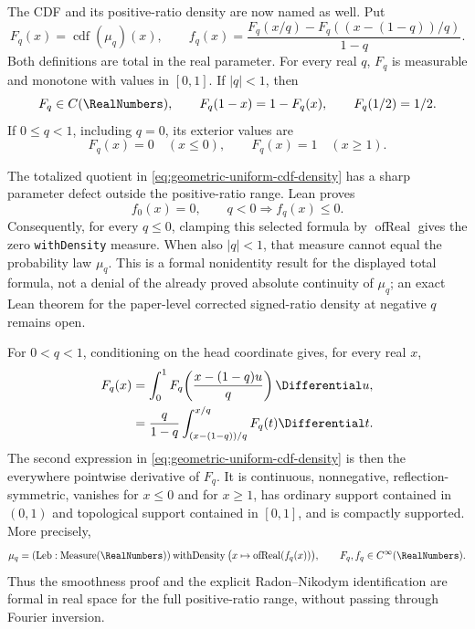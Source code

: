 \documentclass[11pt,oneside]{article}
\theoremstyle{definition}
\theoremstyle{remark}
\begin{document}
The CDF and its positive-ratio density are now named as well.  Put
\begin{equation}
 F_q(x)=\operatorname{cdf}(\mu_q)(x),
 \qquad
 f_q(x)=\frac{F_q(x/q)-F_q((x-(1-q))/q)}{1-q}.
 \label{eq:geometric-uniform-cdf-density}
\end{equation}
Both definitions are total in the real parameter.  For every real \(q\), \(F_q\) is
measurable and monotone with values in \([0,1]\).  If \(|q|<1\), then
\begin{equation}
 F_q\in C(\RealNumbers),
 \qquad F_q(1-x)=1-F_q(x),
 \qquad F_q(1/2)=1/2.                                      \label{eq:geometric-cdf-reflection}
\end{equation}
If \(0\le q<1\), including \(q=0\), its exterior values are
\begin{equation}
 F_q(x)=0\quad(x\le0),
 \qquad F_q(x)=1\quad(x\ge1).                              \label{eq:geometric-cdf-tails}
\end{equation}

The totalized quotient in \eqref{eq:geometric-uniform-cdf-density} has a sharp
parameter defect outside the positive-ratio range.  Lean proves
\[
 f_0(x)=0,\qquad q<0\Longrightarrow f_q(x)\le0.
\]
Consequently, for every \(q\le0\), clamping this selected formula by
\(\operatorname{ofReal}\) gives the zero \texttt{withDensity} measure.  When also
\(|q|<1\), that measure cannot equal the probability law \(\mu_q\).  This is a
formal nonidentity result for the displayed total formula, not a denial of the
already proved absolute continuity of \(\mu_q\); an exact Lean theorem for the
paper-level corrected signed-ratio density at negative \(q\) remains open.

For \(0<q<1\), conditioning on the head coordinate gives, for every real \(x\),
\begin{align}
 F_q(x)
 &=\int_0^1F_q\!\left(\frac{x-(1-q)u}{q}\right)\Differential u,
                                                                  \label{eq:geometric-cdf-integral}\\
 &=\frac{q}{1-q}\int_{(x-(1-q))/q}^{x/q}F_q(t)\Differential t.             \label{eq:geometric-cdf-interval-integral}
\end{align}
The second expression in \eqref{eq:geometric-uniform-cdf-density} is then the everywhere
pointwise derivative of \(F_q\).  It is continuous, nonnegative, reflection-symmetric,
vanishes for \(x\le0\) and for \(x\ge1\), has ordinary support contained in \((0,1)\) and
topological support contained in \([0,1]\), and is compactly supported.  More precisely,
\begin{equation}
 \mu_q=(\operatorname{Leb}:\operatorname{Measure}(\RealNumbers))
   \mathbin{\mathrm{withDensity}}
   \bigl(x\mapsto\operatorname{ofReal}(f_q(x))\bigr),
 \qquad F_q,f_q\in C^\infty(\RealNumbers).                            \label{eq:geometric-density-rn}
\end{equation}
Thus the smoothness proof and the explicit Radon--Nikodym identification are formal in real
space for the full positive-ratio range, without passing through Fourier inversion.
\end{document}
